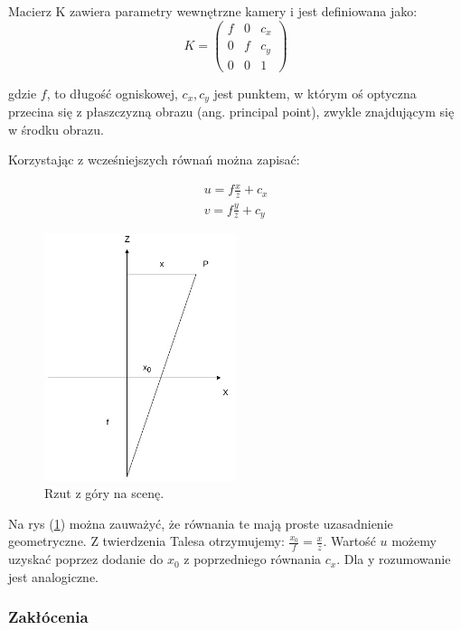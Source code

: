 \documentclass[oneside, eng]{mgr}
\begin{document}
Macierz K zawiera parametry wewnętrzne kamery i jest definiowana jako:
\begin{equation}
	K = \left( \begin{array}{lll}
		f & 0 & c_x \\
		0 & f & c_y \\
		0 & 0 & 1
	\end{array} \right)
\end{equation}

gdzie $f$, to długość ogniskowej, $c_x, c_y$ jest punktem, w którym oś optyczna przecina się z płaszczyzną obrazu (ang. principal point), zwykle znajdującym się w środku obrazu.

Korzystając z wcześniejszych równań można zapisać:

\begin{align*}
	u = f \frac{x}{z} + c_x \\
	v = f \frac{y}{z} + c_y
\end{align*}

\begin{figure}
\centering
	\includegraphics[width=0.50\textwidth]{rzutowanie.jpg}\par\vspace{1cm}
\caption{Rzut z góry na scenę.}
	\label{fig:projection_up}
\end{figure}

Na rys (\ref{fig:projection_up}) można zauważyć, że równania te mają proste uzasadnienie geometryczne. Z twierdzenia Talesa otrzymujemy: 
$\frac{x_0}{f} = \frac{x}{z}$. Wartość $u$ możemy uzyskać poprzez dodanie do $x_0$ z poprzedniego równania $c_x$. Dla y rozumowanie jest analogiczne.


\subsubsection{Zakłócenia}
\end{document}
